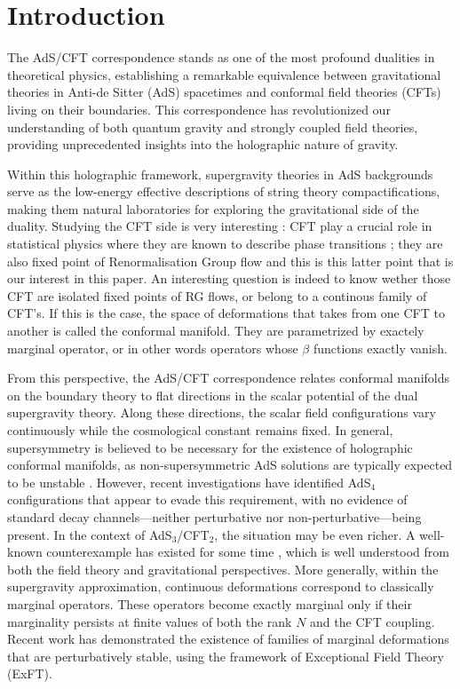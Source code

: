 \documentclass[11pt]{article}
\begin{document}
\section{Introduction}

The AdS/CFT correspondence \cite{Maldacena:1997re} stands as one of the most profound dualities in theoretical physics, establishing a remarkable equivalence between gravitational theories in Anti-de Sitter (AdS) spacetimes and conformal field theories (CFTs) living on their boundaries. This correspondence has revolutionized our understanding of both quantum gravity and strongly coupled field theories, providing unprecedented insights into the holographic nature of gravity. 

Within this holographic framework, supergravity theories in AdS backgrounds serve as the low-energy effective descriptions of string theory compactifications, making them natural laboratories for exploring the gravitational side of the duality. Studying the CFT side is very interesting : CFT play a crucial role in statistical physics where they are known to describe phase transitions ; they are also fixed point of Renormalisation Group flow and this is this latter point that is our interest in this paper. An interesting question is indeed to know wether those CFT are isolated fixed points of RG flows, or belong to a continous family of CFT's. If this is the case, the space of deformations that takes from one CFT to another is called the conformal manifold. They are parametrized by exactely marginal operator, or in other words operators whose $\beta$ functions exactly vanish. 

From this perspective, the AdS/CFT correspondence relates conformal manifolds on the boundary theory to flat directions in the scalar potential of the dual supergravity theory. Along these directions, the scalar field configurations vary continuously while the cosmological constant remains fixed. In general, supersymmetry is believed to be necessary for the existence of holographic conformal manifolds, as non-supersymmetric AdS solutions are typically expected to be unstable \cite{Ooguri:2016pdq,Palti:2019pca}. However, recent investigations \cite{Giambrone:2021wsm} have identified AdS$_4$ configurations that appear to evade this requirement, with no evidence of standard decay channels—neither perturbative nor non-perturbative—being present. In the context of AdS$_3$/CFT$_2$, the situation may be even richer. A well-known counterexample has existed for some time \cite{Aharony:2001dp,Dong:2014tsa}, which is well understood from both the field theory and gravitational perspectives. More generally, within the supergravity approximation, continuous deformations correspond to classically marginal operators. These operators become exactly marginal only if their marginality persists at finite values of both the rank $N$ and the CFT coupling. Recent work \cite{Eloy:2024lwn} has demonstrated the existence of families of marginal deformations that are perturbatively stable, using the framework of Exceptional Field Theory (ExFT).
\end{document}
